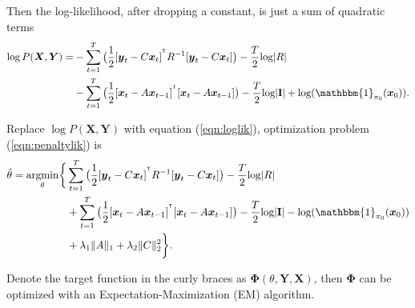\documentclass[fleqn]{article}
\let\oldref\ref
\renewcommand{\ref}[1]{(\oldref{#1})}
\newcommand{\T}{^{\ensuremath{\mathsf{T}}}}           %
\newcommand{\argmin}{\operatornamewithlimits{argmin}}
\providecommand{\mb}[1]{\boldsymbol{#1}}
\newcommand{\bx}{\mb{x}}
\newcommand{\by}{\mb{y}}
\newcommand{\bX}{\mb{X}}
\newcommand{\bY}{\mb{Y}}
\begin{document}
Then the log-likelihood, after dropping a constant, is just a sum of quadratic terms
\begin{equation}\label{eqn:loglik}
\begin{split}
\log  P(\bX,\bY)=&-\sum\limits_{t=1}^{T}\big(\frac{1}{2}[\by_t-C\bx_t]^{\T}R^{-1}[\by_t-C\bx_t]\big)-\frac{T}{2}\text{log}|R|\\
&-\sum\limits_{t=1}^{T}\big(\frac{1}{2}[\bx_t-A\bx_{t-1}]^{\T}[\bx_t-A\bx_{t-1}]\big)-\frac{T}{2}\text{log}|\mathbf{I}|+ \text{log}(\mathbbm{1}_{\mathbf{\pi}_0}(\bx_0)).
\end{split}
\end{equation}

Replace $\log  P(\bX,\bY)$ with equation \ref{eqn:loglik}, optimization problem \ref{eqn:penaltylik} is
\begin{equation}\label{eqn:penaltylik2}
\begin{split}
\hat{\theta}=\argmin_{\substack{\theta}}\biggl\{&\sum\limits_{t=1}^{T}\big(\frac{1}{2}[\by_t-C\bx_t]^{\T}R^{-1}[\by_t-C\bx_t]\big)-\frac{T}{2}\text{log}|R|\\
&+\sum\limits_{t=1}^{T}\big(\frac{1}{2}[\bx_t-A\bx_{t-1}]^{\T}[\bx_t-A\bx_{t-1}]\big)-\frac{T}{2}\text{log}|\mathbf{I}| - \text{log}(\mathbbm{1}_{\mathbf{\pi}_0}(\bx_0))\\
&+\lambda_1\|A\|_1+\lambda_2\|C\|_2^2\biggr\}.
\end{split}
\end{equation}

Denote the target function in the curly braces  as $\mathbf{\Phi}(\theta,\bY,\bX)$, then $\mathbf{\Phi}$ can be optimized with an Expectation-Maximization (EM) algorithm.
\end{document}
